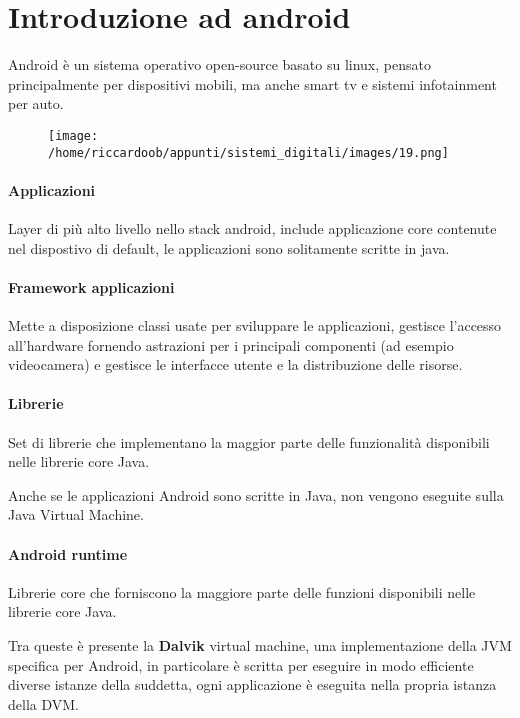 \chapter{Introduzione ad android}
Android è un sistema operativo open-source basato su linux, pensato principalmente per dispositivi mobili, ma anche smart tv e sistemi infotainment per auto.

\begin{figure}[H]
    \centering
    \texttt{[image: /home/riccardoob/appunti/sistemi\_digitali/images/19.png]}
\end{figure}

\subsubsection{Applicazioni}
Layer di più alto livello nello stack android, include applicazione core contenute nel dispostivo di default, le applicazioni sono solitamente scritte in java.

\subsubsection{Framework applicazioni}
Mette a disposizione classi usate per sviluppare le applicazioni, gestisce l'accesso all'hardware fornendo astrazioni per i principali componenti (ad esempio videocamera) e gestisce le interfacce utente e la distribuzione delle risorse.

\subsubsection{Librerie}
Set di librerie che implementano la maggior parte delle funzionalità disponibili nelle librerie core Java.

Anche se le applicazioni Android sono scritte in Java, non vengono eseguite sulla Java Virtual Machine.

\subsubsection{Android runtime}
Librerie core che forniscono la maggiore parte delle funzioni disponibili nelle librerie core Java.

Tra queste è presente la \textbf{Dalvik} virtual machine, una implementazione della JVM specifica per Android, in particolare è scritta per eseguire in modo efficiente diverse istanze della suddetta, ogni applicazione è eseguita nella propria istanza della DVM.


